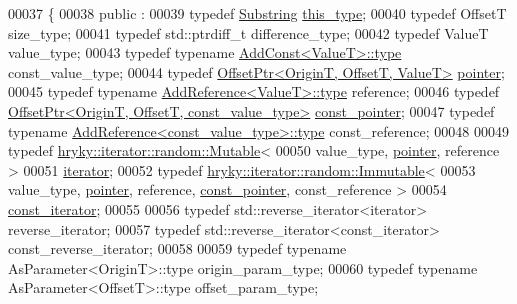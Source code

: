 \begin{DoxyCode}
00037 \{
00038 \textcolor{keyword}{public} :
00039     \textcolor{keyword}{typedef} \hyperlink{classhryky_1_1_substring}{Substring}                                       \hyperlink{classhryky_1_1_substring}{this_type};
00040     \textcolor{keyword}{typedef} OffsetT                                         size\_type;
00041     \textcolor{keyword}{typedef} std::ptrdiff\_t                                  difference\_type;
00042     \textcolor{keyword}{typedef} ValueT                                          value\_type;
00043     \textcolor{keyword}{typedef} \textcolor{keyword}{typename} \hyperlink{classhryky_1_1_add_const_adb29046fcfdac9d716cb5cb3c28d42ac}{AddConst<ValueT>::type}                 const\_value\_type;
00044     \textcolor{keyword}{typedef} \hyperlink{classhryky_1_1_offset_ptr}{OffsetPtr<OriginT, OffsetT, ValueT>}             \hyperlink{classhryky_1_1_offset_ptr}{pointer};
00045     \textcolor{keyword}{typedef} \textcolor{keyword}{typename} \hyperlink{classhryky_1_1_add_reference_a4b90c1381625432ba6152b7388bc4399}{AddReference<ValueT>::type}             reference;
00046     \textcolor{keyword}{typedef} \hyperlink{classhryky_1_1_offset_ptr}{OffsetPtr<OriginT, OffsetT, const_value_type>}   \hyperlink{classhryky_1_1_offset_ptr}{const_pointer};
00047     \textcolor{keyword}{typedef} \textcolor{keyword}{typename} \hyperlink{classhryky_1_1_add_reference_a4b90c1381625432ba6152b7388bc4399}{AddReference<const_value_type>::type}   const\_reference;
00048 
00049     \textcolor{keyword}{typedef} \hyperlink{classhryky_1_1iterator_1_1random_1_1_mutable}{hryky::iterator::random::Mutable}<
00050         value\_type, \hyperlink{classhryky_1_1_offset_ptr}{pointer}, reference >
00051             \hyperlink{classhryky_1_1iterator_1_1random_1_1_mutable}{iterator};
00052     \textcolor{keyword}{typedef} \hyperlink{classhryky_1_1iterator_1_1random_1_1_immutable}{hryky::iterator::random::Immutable}<
00053         value\_type, \hyperlink{classhryky_1_1_offset_ptr}{pointer}, reference, \hyperlink{classhryky_1_1_offset_ptr}{const_pointer}, const\_reference >
00054             \hyperlink{classhryky_1_1iterator_1_1random_1_1_immutable}{const_iterator};
00055 
00056     \textcolor{keyword}{typedef} std::reverse\_iterator<iterator>             reverse\_iterator;
00057     \textcolor{keyword}{typedef} std::reverse\_iterator<const\_iterator>       const\_reverse\_iterator;
00058 
00059     \textcolor{keyword}{typedef} \textcolor{keyword}{typename} AsParameter<OriginT>::type    origin\_param\_type;
00060     \textcolor{keyword}{typedef} \textcolor{keyword}{typename} AsParameter<OffsetT>::type    offset\_param\_type;

\end{DoxyCode}
